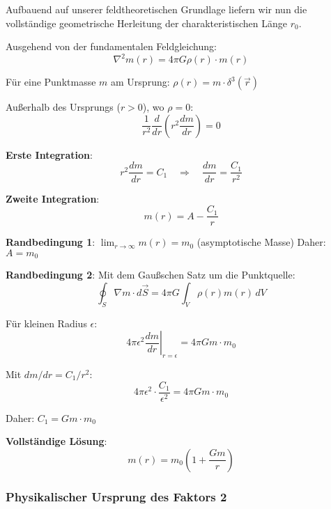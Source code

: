 \documentclass[12pt,a4paper]{article}
\begin{document}
Aufbauend auf unserer feldtheoretischen Grundlage liefern wir nun die vollständige geometrische Herleitung der charakteristischen Länge $r_0$.

Ausgehend von der fundamentalen Feldgleichung:
\begin{equation}
	\nabla^2 m(r) = 4\pi G \rho(r) \cdot m(r)
\end{equation}

Für eine Punktmasse $m$ am Ursprung: $\rho(r) = m \cdot \delta^3(\vec{r})$

Außerhalb des Ursprungs ($r > 0$), wo $\rho = 0$:
\begin{equation}
	\frac{1}{r^2}\frac{d}{dr}\left(r^2 \frac{dm}{dr}\right) = 0
\end{equation}

\textbf{Erste Integration}:
\begin{equation}
	r^2 \frac{dm}{dr} = C_1 \quad \Rightarrow \quad \frac{dm}{dr} = \frac{C_1}{r^2}
\end{equation}

\textbf{Zweite Integration}:
\begin{equation}
	m(r) = A - \frac{C_1}{r}
\end{equation}

\textbf{Randbedingung 1}: $\lim_{r \to \infty} m(r) = m_0$ (asymptotische Masse)
Daher: $A = m_0$

\textbf{Randbedingung 2}: Mit dem Gaußschen Satz um die Punktquelle:
\begin{equation}
	\oint_S \nabla m \cdot d\vec{S} = 4\pi G \int_V \rho(r) m(r) \, dV
\end{equation}

Für kleinen Radius $\epsilon$:
\begin{equation}
	4\pi \epsilon^2 \left.\frac{dm}{dr}\right|_{r=\epsilon} = 4\pi G m \cdot m_0
\end{equation}

Mit $dm/dr = C_1/r^2$:
\begin{equation}
	4\pi \epsilon^2 \cdot \frac{C_1}{\epsilon^2} = 4\pi G m \cdot m_0
\end{equation}

Daher: $C_1 = G m \cdot m_0$

\textbf{Vollständige Lösung}:
\begin{equation}
	m(r) = m_0\left(1 + \frac{Gm}{r}\right)
\end{equation}

\subsubsection{Physikalischer Ursprung des Faktors 2}
\label{subsubsec:factor_2_origin}
\end{document}

